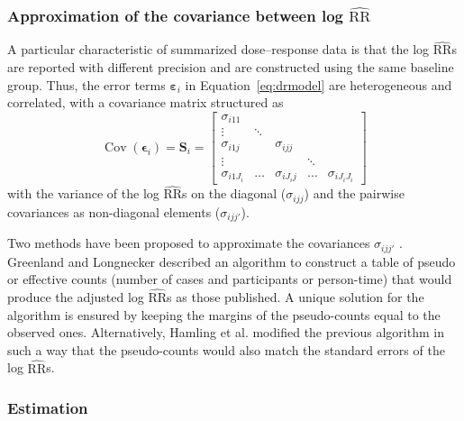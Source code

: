 \documentclass[11pt,a4paper,twoside,openany]{book}\usepackage{knitr}
\DeclareMathOperator{\Cov}{Cov}
\begin{document}
{\subsubsection*{Approximation of the covariance between log $\widehat{\mathrm{RR}}$}\label{sec:cov}

\noindent A particular characteristic of summarized dose--response data is that the log $\widehat{\mathrm{RR}}$s are reported with different precision and are constructed using the same baseline group. Thus, the error terms $\boldsymbol{\varepsilon}_i$ in Equation~\ref{eq:drmodel} are heterogeneous and correlated, with a covariance matrix structured as
\begin{equation}
\Cov\left(\boldsymbol{\epsilon}_i\right) = \mathbf{S}_i = \left[
\begin{array}{ccccc}
\sigma_{i11} & \ \ & \ & & \ \\
\vdots \ & \ddots & & & \ \\
\sigma_{i1j}& \ & \sigma_{ijj}& & \ \\
\vdots & \ & \ & \ddots & \\
\sigma_{i1J_i} & \ldots & \sigma_{iJ_ij} & \ldots & \sigma_{iJ_iJ_i}
\end{array}
\right] 
\label{eq:S_i}
\end{equation}
\noindent with the variance of the log $\widehat{\mathrm{RR}}$s on the diagonal ($\sigma_{ijj}$) and the pairwise covariances as non-diagonal elements ($\sigma_{ijj'}$).

\noindent Two methods have been proposed to approximate the covariances $\sigma_{ijj'}$ \citep{greenland1992methods, hamling2008facilitating}. Greenland and Longnecker described an algorithm to construct a table of pseudo or effective counts (number of cases and participants or person-time) that would produce the adjusted log $\widehat{\mathrm{RR}}$s as those published. A unique solution for the algorithm is ensured by keeping the margins of the pseudo-counts equal to the observed ones. Alternatively, Hamling et al. modified the previous algorithm in such a way that the pseudo-counts would also match the standard errors of the log $\widehat{\mathrm{RR}}$s. 

\subsubsection*{Estimation}

}
\end{document}
